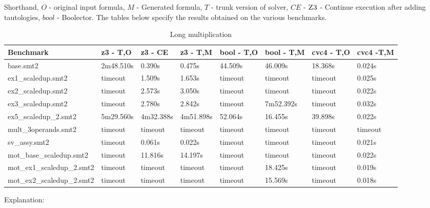 Shorthand, $O$ - original input formula, $M$ - Generated formula, $T$ - trunk version of solver, $CE$ - $\textsc{Z3}$ - Continue execution after adding tautologies, $bool$ - Boolector.
The tables below specify the results obtained on the various benchmarks. 

\begin{table}[]
\centering
\caption{Long multiplication}
\label{my-label}
\begin{tabular}{|l|l|l|l|l|l|l|l|}
\hline
Benchmark                  & z3 - T,O  & z3 - CE   & z3 - T,M  & bool - T,O & bool - T,M & cvc4 - T,O & cvc4 -T,M \\ \hline
base.smt2                  & 2m48.510s & 0.390s    & 0.475s    & 44.509s    & 46.009s    & 18.368s    & 0.024s    \\ \hline
ex1\_scaledup.smt2         & timeout   & 1.509s    & 1.653s    & timeout    & timeout    & timeout    & 0.025s    \\ \hline
ex2\_scaledup.smt2         & timeout   & 2.573s    & 3.050s    & timeout    & timeout    & timeout    & 0.022s    \\ \hline
ex3\_scaledup.smt2         & timeout   & 2.780s    & 2.842s    & timeout    & 7m52.392s  & timeout    & 0.032s    \\ \hline
ex5\_scaledup\_2.smt2      & 5m29.560s & 4m32.388s & 4m51.898s & 52.064s    & 16.455s    & 39.898s    & 0.022s    \\ \hline
mult\_3operands.smt2       & timeout   & timeout   & timeout   & timeout    & timeout    & timeout    & timeout   \\ \hline
sv\_assy.smt2              & timeout   & 0.061s    & 0.022s    & timeout    & timeout    & timeout    & 0.021s    \\ \hline
mot\_base\_scaledup.smt2   & timeout   & 11.816s   & 14.197s   & timeout    & timeout    & timeout    & 0.022s    \\ \hline
mot\_ex1\_scaledup\_2.smt2 & timeout   & timeout   & timeout   & timeout    & 18.425s    & timeout    & 0.019s    \\ \hline
mot\_ex2\_scaledup\_2.smt2 & timeout   & timeout   & timeout   & timeout    & 15.569s    & timeout    & 0.018s    \\ \hline
\end{tabular}
\end{table}

Explanation: 

